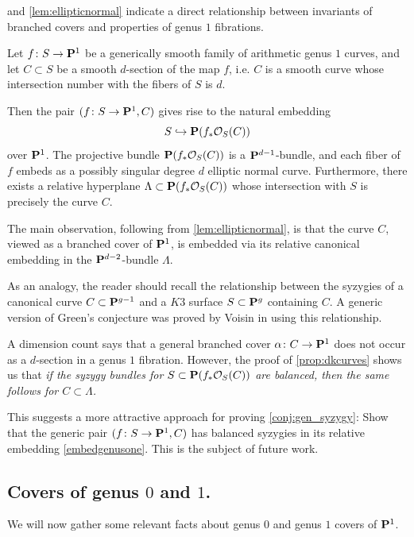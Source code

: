 \documentclass[11pt, two side, letterpaper, final]{amsart}
\renewcommand{\P}{{\bf P}}
\newcommand {\from}{\colon}
\newcommand{\cO}{\mathcal{O}}
\begin{document}
\begin{remark}   and \cref{lem:ellipticnormal} indicate a direct relationship between invariants of branched covers and properties of genus $1$ fibrations.  

Let $f \from S \to \P^{1}$ be a generically smooth family of arithmetic genus $1$ curves, and let $C \subset S$ be a smooth $d$-section of the map $f$, i.e. $C$ is a smooth curve whose intersection number with the fibers of $S$ is $d$. 

Then the pair $(f \from S \to \P^{1}, C)$ gives rise to the natural embedding 
\begin{equation}\label{embedgenusone}
S \hookrightarrow \P(f_{*}\cO_{S}(C))
\end{equation}
over $\P^{1}$. The projective bundle $\P(f_{*}\cO_{S}(C))$  is a $\P^{d-1}$-bundle, and each fiber of $f$ embeds as a possibly singular degree $d$ elliptic normal curve. Furthermore, there exists a relative hyperplane $\Lambda \subset \P(f_{*}\cO_{S}(C))$ whose intersection with $S$ is precisely the curve $C$.  

The main observation, following from \cref{lem:ellipticnormal}, is that the curve $C$, viewed as a branched cover of $\P^{1}$, is embedded via its relative canonical embedding in the $\P^{d-2}$-bundle $\Lambda$. 

As an analogy, the reader should recall the relationship between the syzygies of a canonical curve $C \subset \P^{g-1}$ and a $K3$ surface $S \subset \P^{g}$ containing $C$.  A generic version of Green's conjecture was proved by Voisin in \cite{voisin_greens_2002} using this relationship.

A dimension count says that a general branched cover $\alpha \from C \to \P^{1}$ does not occur as a $d$-section in a genus $1$ fibration.  However, the proof of \cref{prop:dkcurves} shows us that \emph{if the syzygy bundles for $S \subset \P(f_{*}\cO_{S}(C))$ are balanced, then the same follows for $C \subset \Lambda$.} 

This suggests a more attractive approach for proving \cref{conj:gen_syzygy}:  Show that the generic pair $(f \from S \to \P^{1}, C)$ has balanced syzygies in its relative embedding \eqref{embedgenusone}.  This is the subject of future work.
\end{remark}

\subsection{Covers of genus \texorpdfstring{$0$}{zero} and \texorpdfstring{$1$}{one}.} 
We will now gather some relevant facts about genus $0$ and genus $1$ covers of $\P^1$.
\end{document}
